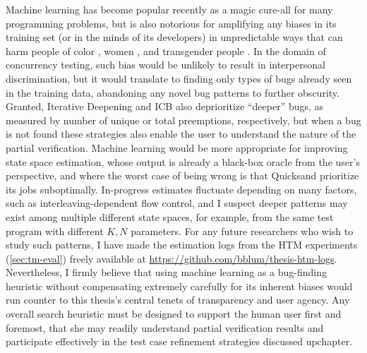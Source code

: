 Machine learning has become popular recently as a magic cure-all for many programming problems,
but is also notorious for amplifying any biases in its training set
(or in the minds of its developers)
in unpredictable ways
that can harm people of color \cite{conceptnet-bias,gender-shades},
women \cite{gender-bias-ai,amazon-ai},
and transgender people \cite{misgendering-machines}.
In the domain of concurrency testing,
such bias would be unlikely to result in interpersonal discrimination,
but
it would translate to
finding only types of bugs
already seen in the training data,
abandoning any novel bug patterns to further obscurity.
Granted,
Iterative Deepening and
ICB also deprioritize ``deeper'' bugs,
as measured by number of unique or total preemptions, respectively,
but when a bug is not found
these strategies also enable the user to understand the nature of the partial verification.
%
Machine learning would be more appropriate for improving state space estimation,
whose output is already a black-box oracle from the user's perspective,
and where the worst case of being wrong
is that Quicksand prioritize its jobs suboptimally. %
In-progress estimates fluctuate depending on many factors,
such as interleaving-dependent flow control,
and I suspect deeper patterns may exist among multiple different state spaces,
for example,
from the same test program with different $K,N$ parameters.
For any future researchers who wish to study such patterns,
I have made the estimation logs from the HTM experiments (\cref{sec:tm-eval})
freely available at \url{https://github.com/bblum/thesis-htm-logs}.
%
Nevertheless,
I firmly believe that using machine learning as a bug-finding heuristic
without compensating extremely carefully for its inherent biases
would run counter to this thesis's central tenets of transparency and user agency.
Any overall search heuristic
must be designed to support the human user first and foremost,
that she may readily understand partial verification results
and participate effectively in the test case refinement strategies discussed
upchapter. %

